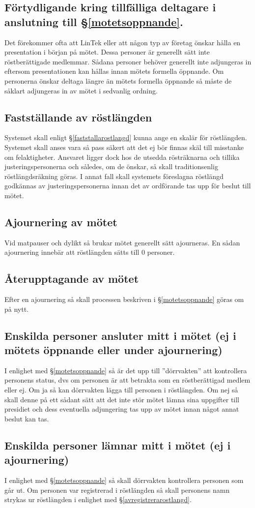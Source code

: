 \documentclass{datateknologsektionen-document}
\begin{document}
\subsection{Förtydligande kring tillfälliga deltagare i anslutning till \S \ref{motetsoppnande}.}
Det förekommer ofta att LinTek eller att någon typ av företag önskar hålla en presentation i början
på mötet. Dessa personer är generellt sätt inte röstberättigade medlemmar. Sådana personer
behöver generellt inte adjungeras in eftersom presentationen kan hållas innan mötets formella
öppnande. Om personerna önskar deltaga längre än mötets formella öppnande så måste de såklart
adjungeras in av mötet i sedvanlig ordning.
\subsection{Fastställande av röstlängden}
Systemet skall enligt \S \ref{faststallarostlangd} kunna ange en skalär för röstlängden. Systemet skall anses vara så pass
säkert att det ej bör finnas skäl till misstanke om felaktigheter. Ansvaret ligger dock hos de utsedda
rösträknarna och tillika justeringspersonerna och således, om de önskar, så skall traditionsenlig
röstlängdsräkning göras. I annat fall skall systemets föreslagna röstlängd godkännas av
justeringspersonerna innan det av ordförande tas upp för beslut till mötet.
\subsection{Ajournering av mötet}
Vid matpauser och dylikt så brukar mötet generellt sätt ajourneras. En sådan ajournering innebär att
röstlängden sätts till 0 personer.
\subsection{Återupptagande av mötet}
Efter en ajournering så skall processen beskriven i \S \ref{motetsoppnande} göras om på nytt.
\subsection{Enskilda personer ansluter mitt i mötet (ej i mötets öppnande eller under ajournering)}
I enlighet med \S \ref{motetsoppnande} så är det upp till ”dörrvakten” att kontrollera personens status, dvs om personen
är att betrakta som en röstberättigad medlem eller ej. Om ja så kan dörrvakten lägga till personen i
röstlängden. Om nej så skall denne på ett sådant sätt att det inte stör mötet lämna sina uppgifter till
presidiet och dess eventuella adjungering tas upp av mötet innan något annat beslut kan tas.
\subsection{Enskilda personer lämnar mitt i mötet (ej i ajournering)}
I enlighet med \S \ref{motetsoppnande} så skall dörrvakten kontrollera personen som går ut. Om personen var registrerad
i röstlängden så skall personens namn strykas ur röstlängden i enlighet med \S \ref{avregistrerarostlangd}.
\end{document}
